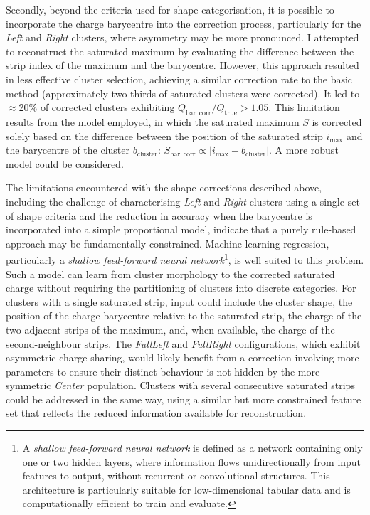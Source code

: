 Secondly, beyond the criteria used for shape categorisation, it is possible to incorporate the charge barycentre into the correction process, particularly for the \textit{Left} and \textit{Right} clusters, where asymmetry may be more pronounced. I attempted to reconstruct the saturated maximum by evaluating the difference between the strip index of the maximum and the barycentre. However, this approach resulted in less effective cluster selection, achieving a similar correction rate to the basic method (approximately two-thirds of saturated clusters were corrected). It led to $\approx$20\% of corrected clusters exhibiting $Q_\mathrm{bar.\,corr}/Q_\mathrm{true}>1.05$. This limitation results from the model employed, in which the saturated maximum $S$ is corrected solely based on the difference between the position of the saturated strip $i_\mathrm{max}$ and the barycentre of the cluster $b_\mathrm{cluster}$: $S_\mathrm{bar.\,corr} \propto |i_\mathrm{max} - b_\mathrm{cluster}|$. A more robust model could be considered.

\vspace{0.5 cm}

The limitations encountered with the shape corrections described above, including the challenge of characterising \textit{Left} and \textit{Right} clusters using a single set of shape criteria and the reduction in accuracy when the barycentre is incorporated into a simple proportional model, indicate that a purely rule-based approach may be fundamentally constrained. Machine-learning regression, particularly a \textit{shallow feed-forward neural network}\footnote{A \textit{shallow feed-forward neural network} is defined as a network containing only one or two hidden layers, where information flows unidirectionally from input features to output, without recurrent or convolutional structures. This architecture is particularly suitable for low-dimensional tabular data and is computationally efficient to train and evaluate.}, is well suited to this problem. Such a model can learn from cluster morphology to the corrected saturated charge without requiring the partitioning of clusters into discrete categories. For clusters with a single saturated strip, input could include the cluster shape, the position of the charge barycentre relative to the saturated strip, the charge of the two adjacent strips of the maximum, and, when available, the charge of the second-neighbour strips. The \textit{FullLeft} and \textit{FullRight} configurations, which exhibit asymmetric charge sharing, would likely benefit from a correction involving more parameters to ensure their distinct behaviour is not hidden by the more symmetric \textit{Center} population. Clusters with several consecutive saturated strips could be addressed in the same way, using a similar but more constrained feature set that reflects the reduced information available for reconstruction.

